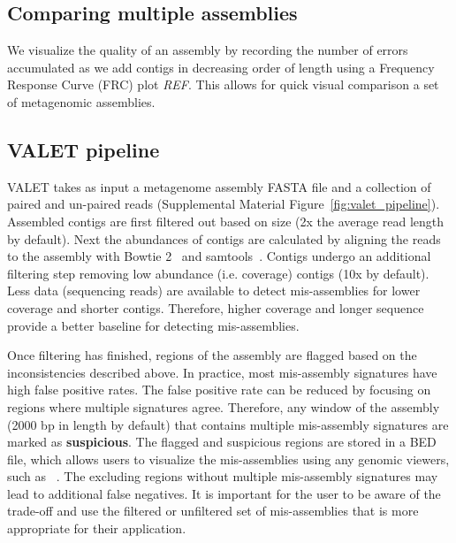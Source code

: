 \documentclass{bioinfo}
\begin{document}
\subsection{Comparing multiple assemblies}

We visualize the quality of an assembly by recording the number of errors accumulated as we add contigs in decreasing order of length using a Frequency Response Curve (FRC) plot \emph{REF}.
This allows for quick visual comparison a set of metagenomic assemblies.


\subsection{VALET pipeline}

VALET takes as input a metagenome assembly \textsc{FASTA} file and a collection of paired and un-paired reads  (Supplemental Material Figure~\ref{fig:valet_pipeline}).
Assembled contigs are first filtered out based on size (2x the average read length by default).
Next the abundances of contigs are calculated by aligning the reads to the assembly with Bowtie 2~\citep{langmead2012fast} and samtools~\citep{li2009sequence}.
Contigs undergo an additional filtering step removing low abundance (i.e. coverage) contigs (10x by default).
Less data (sequencing reads) are available to detect mis-assemblies for lower coverage and shorter contigs. 
Therefore, higher coverage and longer sequence provide a better baseline for detecting mis-assemblies.

Once filtering has finished, regions of the assembly are flagged based on the inconsistencies described above.
In practice, most mis-assembly signatures have high false positive rates.
The false positive rate can be reduced by focusing on regions where multiple signatures agree.  
Therefore, any window of the assembly (2000 bp in length by default) that contains multiple mis-assembly signatures are marked as \textbf{suspicious}.
The flagged and suspicious regions are stored in a \textsc{BED} file, which allows users to visualize the mis-assemblies using any genomic viewers, such as ~\citep{thorvaldsdottir2012integrative}.
The excluding regions without multiple mis-assembly signatures may lead to additional false negatives. It is important for the user to be aware of the trade-off and use the filtered or unfiltered set of mis-assemblies that is more appropriate for their application.

\end{document}
